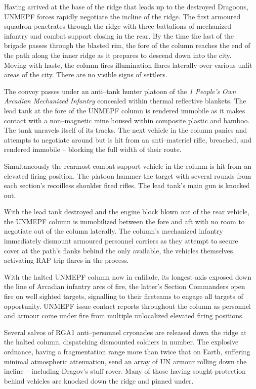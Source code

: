 Having arrived at the base of the ridge that leads up to the destroyed Dragoons, UNMEPF forces rapidly negotiate the incline of the ridge. The first armoured squadron penetrates through the ridge with three battalions of mechanized infantry and combat support closing in the rear. By the time the last of the brigade passes through the blasted rim, the fore of the column reaches the end of the path along the inner ridge as it prepares to descend down into the city. Moving with haste, the column fires illumination flares laterally over various unlit areas of the city. There are no visible signs of settlers.

The convoy passes under an anti--tank hunter platoon of the {\it 1 People's Own Arcadian Mechanized Infantry} concealed within thermal reflective blankets. The lead tank at the fore of the UNMEPF column is rendered immobile as it makes contact with a non--magnetic mine housed within composite plastic and bamboo. The tank unravels itself of its tracks. The next vehicle in the column panics and attempts to negotiate around but is hit from an anti--materiel rifle, breached, and rendered immobile -- blocking the full width of their route.

Simultaneously the rearmost combat support vehicle in the column is hit from an elevated firing position. The platoon hammer the target with several rounds from each section's recoilless shoulder fired rifles. The lead tank's main gun is knocked out. 

With the lead tank destroyed and the engine block blown out of the rear vehicle, the UNMEPF column is immobilized between the fore and aft with no room to negotiate out of the column laterally. The column's mechanized infantry immediately dismount armoured personnel carriers as they attempt to secure cover at the path's flanks behind the only available, the vehicles themselves, activating RAP trip flares in the process.

With the halted UNMEPF column now in enfilade, its longest axis exposed down the line of Arcadian infantry arcs of fire, the latter's Section Commanders open fire on well sighted targets, signalling to their fireteams to engage all targets of opportunity. UNMEPF issue contact reports throughout the column as personnel and armour come under fire from multiple unlocalized elevated firing positions.

Several salvos of RGA1 anti--personnel cryonades are released down the ridge at the halted column, dispatching dismounted soldiers in number. The explosive ordnance, having a fragmentation range more than twice that on Earth, suffering minimal atmospheric attenuation, send an array of UN armour rolling down the incline -- including Dragov's staff rover. Many of those having sought protection behind vehicles are knocked down the ridge and pinned under.

